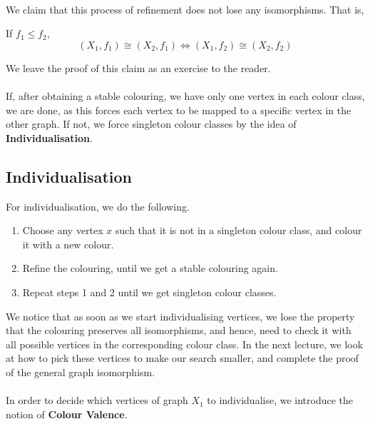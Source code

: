 \paragraph*{}
We claim that this process of refinement does not lose any isomorphisms. That is, 
\begin{claim}
If $f_1 \le f_2$, 
\[
(X_1, f_1) \cong (X_2, f_1) \Leftrightarrow (X_1, f_2) \cong (X_2, f_2)  
\]
\end{claim}
We leave the proof of this claim as an exercise to the reader.

\paragraph*{}
If, after obtaining a stable colouring, we have only one vertex in each colour class, we are done, as this forces each vertex to be mapped to a specific vertex in the other graph. 
If not, we force singleton colour classes by the idea of \textbf{Individualisation}.

\subsection{Individualisation}
For individualisation, we do the following.
\begin{enumerate}
\item Choose any vertex $x$ such that it is not in a singleton colour class, and colour it with a new colour.
\item Refine the colouring, until we get a stable colouring again. 
\item Repeat steps 1 and 2 until we get singleton colour classes.
\end{enumerate}
We notice that as soon as we start individualising vertices, we lose the property that the colouring preserves all isomorphisms, and hence, need to check it with all possible vertices in the corresponding colour class. In the next lecture, we look at how to pick these vertices to make our search smaller, and complete the proof of the general graph isomorphism.


\paragraph*{}
In order to decide which vertices of graph $X_1$ to individualise, we introduce the notion of \textbf{Colour Valence}.

